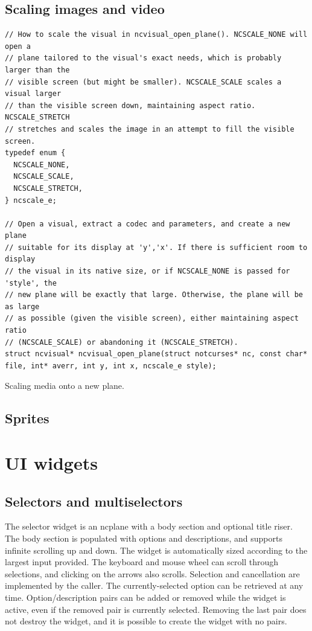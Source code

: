 \documentclass[letterpaper,10pt]{article}
\begin{document}
\subsection{Scaling images and video}
\begin{listing}[!htb]
\begin{verbatim}
// How to scale the visual in ncvisual_open_plane(). NCSCALE_NONE will open a
// plane tailored to the visual's exact needs, which is probably larger than the
// visible screen (but might be smaller). NCSCALE_SCALE scales a visual larger
// than the visible screen down, maintaining aspect ratio. NCSCALE_STRETCH
// stretches and scales the image in an attempt to fill the visible screen.
typedef enum {
  NCSCALE_NONE,
  NCSCALE_SCALE,
  NCSCALE_STRETCH,
} ncscale_e;

// Open a visual, extract a codec and parameters, and create a new plane
// suitable for its display at 'y','x'. If there is sufficient room to display
// the visual in its native size, or if NCSCALE_NONE is passed for 'style', the
// new plane will be exactly that large. Otherwise, the plane will be as large
// as possible (given the visible screen), either maintaining aspect ratio
// (NCSCALE_SCALE) or abandoning it (NCSCALE_STRETCH).
struct ncvisual* ncvisual_open_plane(struct notcurses* nc, const char* file, int* averr, int y, int x, ncscale_e style);
\end{verbatim}
\caption{Scaling media onto a new plane.}
\label{list:scaling}
\end{listing}

\subsection{Sprites}
\cleardoublepage

\section{UI widgets}
\label{sec:uiwidgets}
\subsection{Selectors and multiselectors}

The selector widget is an ncplane with a body section and optional title riser.
The body section is populated with options and descriptions, and supports
infinite scrolling up and down. The widget is automatically sized according to
the largest input provided. The keyboard and mouse wheel can scroll through
selections, and clicking on the arrows also scrolls. Selection and cancellation
are implemented by the caller. The currently-selected option can be retrieved
at any time. Option/description pairs can be added or removed while the
widget is active, even if the removed pair is currently selected. Removing the
last pair does not destroy the widget, and it is possible to create the widget
with no pairs.
\end{document}
